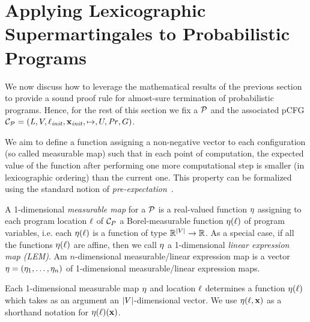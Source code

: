 \section{Applying Lexicographic Supermartingales to Probabilistic Programs}

We now discuss how to leverage the mathematical results of the previous section to provide a sound proof rule for almost-sure termination of probabilistic programs. Hence, for the rest of this section we fix a \PP{} $\mathcal{P}$ and the associated pCFG $\mathcal{C}_{\mathcal{P}}=(\mathit{L},V,\ell_{\mathit{init}},\mathbf{x}_{\mathit{init}},\mapsto,U,\mathit{Pr},G)$.

We aim to define a function assigning a non-negative vector to each configuration (so called measurable map) such that in each point of computation, the expected value of the function after performing one more computational step is smaller (in lexicographic ordering) than the current one. This property can be formalized using the standard  notion of \emph{pre-expectation}~\cite{xxx}.

\begin{definition}
A 1-dimensional \emph{measurable map} for a \PP{} $\mathcal{P}$ is a  
real-valued function $\eta$ 
assigning to each program location $\ell$ of $\mathcal{C}_P$ a Borel-measurable function $\eta(\ell)$  of program variables, i.e. each $\eta(\ell)$  is a function of type $\mathbb{R}^{|V|}\rightarrow \mathbb{R}$. As a special case, if all the functions $\eta(\ell)$ are affine, then we call $\eta$ a 1-dimensional \emph{linear expression map (LEM)}. 
Am $n$-dimensional measurable/linear expression map is a vector $\mathbf{\eta}=(\eta_1,\dots,\eta_n)$ of 1-dimensional measurable/linear expression maps. 
\end{definition}

Each 1-dimensional measurable map $\eta$ and location $\ell$ determines a function $\eta(\ell)$ 
which takes as an argument an $|V|$-dimensional vector. We use $\eta(\ell,\mathbf{x})$ as a shorthand 
notation for $\eta(\ell)(\mathbf{x})$.

